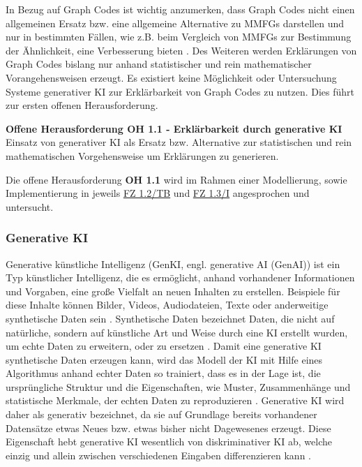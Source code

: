 In Bezug auf Graph Codes ist wichtig anzumerken, dass Graph Codes nicht einen allgemeinen Ersatz bzw. eine allgemeine Alternative zu MMFGs darstellen und nur in bestimmten Fällen, wie z.B. beim Vergleich von MMFGs zur Bestimmung der Ähnlichkeit, eine Verbesserung bieten \cite{gc-2d-proj-mmfg}.
Des Weiteren werden Erklärungen von Graph Codes bislang nur anhand statistischer und rein mathematischer Vorangehensweisen erzeugt.
Es existiert keine Möglichkeit oder Untersuchung Systeme generativer KI zur Erklärbarkeit von Graph Codes zu nutzen.
Dies führt zur ersten offenen Herausforderung.

\begin{tcolorbox}[minipage, colback=white, colframe=black, arc=0pt, outer arc=0pt]
    \textbf{Offene Herausforderung OH 1.1 - Erklärbarkeit durch generative KI} \\
    Einsatz von generativer KI als Ersatz bzw. Alternative zur statistischen und rein mathematischen Vorgehensweise um Erklärungen zu generieren.
\end{tcolorbox}
Die offene Herausforderung \textbf{OH 1.1} wird im Rahmen einer Modellierung, sowie Implementierung in jeweils \hyperref[sec3:model:subsec:fz-explainability]{FZ 1.2/TB} und \hyperref[sec4:impl:subsec:fz-explainability]{FZ 1.3/I} angesprochen und untersucht.

\subsubsection{Generative KI}
\label{sec2:sota:subsubsec:genai}
Generative künstliche Intelligenz (GenKI, engl. generative AI (GenAI)) ist ein Typ künstlicher Intelligenz, die es ermöglicht, anhand vorhandener Informationen und Vorgaben, eine große Vielfalt an neuen Inhalten zu erstellen.
Beispiele für diese Inhalte können Bilder, Videos, Audiodateien, Texte oder anderweitige synthetische Daten sein \cite{gen-ai-tech-target}.
Synthetische Daten bezeichnet Daten, die nicht auf natürliche, sondern auf künstliche Art und Weise durch eine KI erstellt wurden, um echte Daten zu erweitern, oder zu ersetzen \cite{synt-data-ibm}.
Damit eine generative KI synthetische Daten erzeugen kann, wird das Modell der KI mit Hilfe eines Algorithmus anhand echter Daten so trainiert, dass es in der Lage ist, die ursprüngliche Struktur und die Eigenschaften, wie Muster, Zusammenhänge und statistische Merkmale, der echten Daten zu reproduzieren \cite{synth-data-eu, synth-mostlyai}.
Generative KI wird daher als generativ bezeichnet, da sie auf Grundlage bereits vorhandener Datensätze etwas Neues bzw. etwas bisher nicht Dagewesenes erzeugt.
Diese Eigenschaft hebt generative KI wesentlich von diskriminativer KI ab, welche einzig und allein zwischen verschiedenen Eingaben differenzieren kann \cite{computer-woche-genai}.

